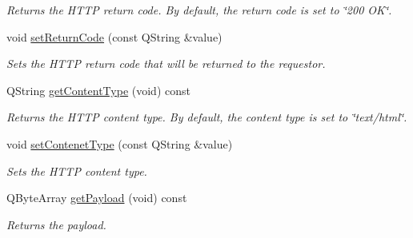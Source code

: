 \begin{DoxyCompactItemize}
\begin{DoxyCompactList}\small\item\em Returns the H\+T\+TP return code. By default, the return code is set to \char`\"{}200 O\+K\char`\"{}. \end{DoxyCompactList}\item 
\mbox{\label{class_a_p_i_response_a4c749e490345ac4d497678d2272dd5f0}} 
void \hyperlink{class_a_p_i_response_a4c749e490345ac4d497678d2272dd5f0}{set\+Return\+Code} (const Q\+String \&value)
\begin{DoxyCompactList}\small\item\em Sets the H\+T\+TP return code that will be returned to the requestor. \end{DoxyCompactList}\item 
\mbox{\label{class_a_p_i_response_a6861e22ef4409885114aac404760daeb}} 
Q\+String \hyperlink{class_a_p_i_response_a6861e22ef4409885114aac404760daeb}{get\+Content\+Type} (void) const
\begin{DoxyCompactList}\small\item\em Returns the H\+T\+TP content type. By default, the content type is set to \char`\"{}text/html\char`\"{}. \end{DoxyCompactList}\item 
\mbox{\label{class_a_p_i_response_a67c8ba2ac3155ae8472f453a36f469f5}} 
void \hyperlink{class_a_p_i_response_a67c8ba2ac3155ae8472f453a36f469f5}{set\+Contenet\+Type} (const Q\+String \&value)
\begin{DoxyCompactList}\small\item\em Sets the H\+T\+TP content type. \end{DoxyCompactList}\item 
\mbox{\label{class_a_p_i_response_ae58db2525b25db3b244a71c8d10b6b98}} 
Q\+Byte\+Array \hyperlink{class_a_p_i_response_ae58db2525b25db3b244a71c8d10b6b98}{get\+Payload} (void) const
\begin{DoxyCompactList}\small\item\em Returns the payload. \end{DoxyCompactList}\item 
\mbox{\label{class_a_p_i_response_a7b36f0565b798ad4740f83b58488f079}} 

\end{DoxyCompactItemize}
